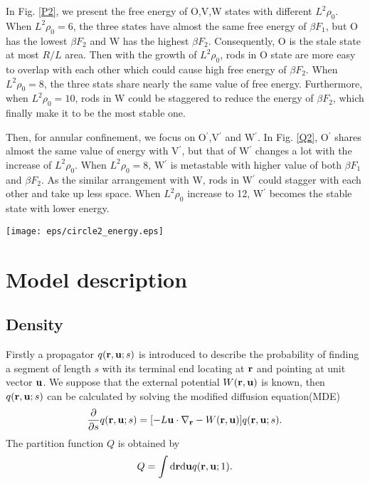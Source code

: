 \documentclass[prl,twocolumn,preprintnumbers,reprint]{revtex4}
\newcommand{\bu}{{\bf u}}
\newcommand{\br}{{\bf r}}
\newcommand{\rd}{{\rm d}}
\newcommand{\be}{\begin{equation}}
\newcommand{\en}{\end{equation}}
\begin{document}
 In Fig. \ref{P2}, we present the free energy of O,V,W states with different $L^2\rho_0$. When $L^2\rho_0=6$, the three states have almost the same free energy of $\beta F_1$, but O has the lowest $\beta F_2$ and W has the highest $\beta F_2$. Consequently, O is the stale state at most $R/L$ area. Then with the growth of $L^2\rho_0$, rods in O state are more easy to overlap with each other which could cause high free energy of $\beta F_2$. When $L^2\rho_0=8$, the three stats share nearly the same value of free energy. Furthermore, when $L^2\rho_0=10$, rods in W could be staggered to reduce the energy of $\beta F_2$, which finally make it to be the most stable one.

Then, for annular confinement, we focus on O$^\prime$,V$^\prime$ and W$^\prime$. In Fig. \ref{Q2}, O$^\prime$ shares almost the same value of energy with V$^\prime$, but that of W$^\prime$ changes a lot with the increase of $L^2\rho_0$. When $L^2\rho_0=8$, W$^\prime$ is metastable with higher value of both $\beta F_1$ and $\beta F_2$. As the similar arrangement with W, rods in W$^\prime$ could stagger with each other and take up less space. When $L^2\rho_0$ increase to 12, W$^\prime$ becomes the stable state with lower energy.



\begin{figure*}[!t]\centering
\texttt{[image: eps/circle2\_energy.eps]}
\caption{Comtrast of free energy about O$^\prime$(circles),V$^\prime$(squares),W$^\prime$(right triangles) in annular confinements when we fixed $L^2\rho_0=8,9.8,12$ and $R^\prime:R=0.2$. } \label{Q2}
\end{figure*}




\section{Model description}
\subsection{Density}

Firstly a propagator $q(\br,\bu;s)$ is introduced to describe the probability of finding a segment of length $s$ with its terminal end locating at $\br$ and pointing at unit vector $\bu$. We suppose that the external potential $W(\br,\bu)$ is known, then $q(\br,\bu;s)$ can be calculated by solving the modified diffusion equation(MDE)
\be \label{q1}
\frac{\partial}{\partial s}q(\br,\bu;s)=[-L\bu\cdot\nabla_\br-W(\br,\bu)]q(\br,\bu;s).
\en
The partition function $Q$ is obtained by
\be \label{q2}
Q=\int\rd\br\rd\bu q(\br,\bu;1).
\en
\end{document}
